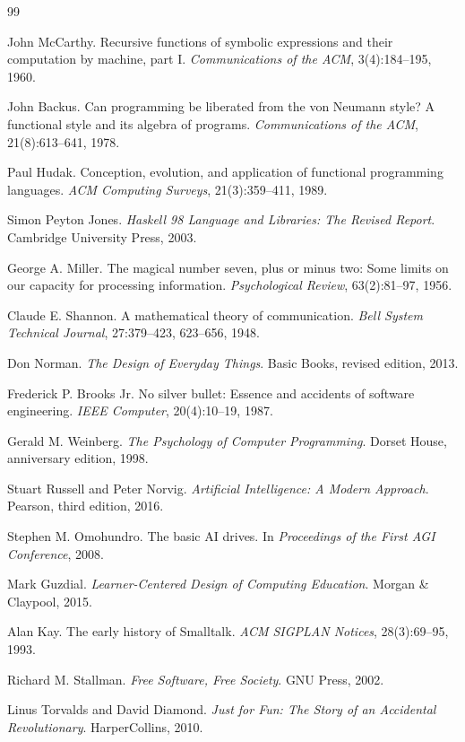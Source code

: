 \documentclass[11pt]{article}
\begin{document}
\newpage
\begin{thebibliography}{99}

John McCarthy.
\newblock Recursive functions of symbolic expressions and their computation by machine, part I.
\newblock \emph{Communications of the ACM}, 3(4):184--195, 1960.

John Backus.
\newblock Can programming be liberated from the von Neumann style? A functional style and its algebra of programs.
\newblock \emph{Communications of the ACM}, 21(8):613--641, 1978.

Paul Hudak.
\newblock Conception, evolution, and application of functional programming languages.
\newblock \emph{ACM Computing Surveys}, 21(3):359--411, 1989.

Simon Peyton Jones.
\newblock \emph{Haskell 98 Language and Libraries: The Revised Report}.
\newblock Cambridge University Press, 2003.

George A. Miller.
\newblock The magical number seven, plus or minus two: Some limits on our capacity for processing information.
\newblock \emph{Psychological Review}, 63(2):81--97, 1956.

Claude E. Shannon.
\newblock A mathematical theory of communication.
\newblock \emph{Bell System Technical Journal}, 27:379--423, 623--656, 1948.

Don Norman.
\newblock \emph{The Design of Everyday Things}.
\newblock Basic Books, revised edition, 2013.

Frederick P. Brooks Jr.
\newblock No silver bullet: Essence and accidents of software engineering.
\newblock \emph{IEEE Computer}, 20(4):10--19, 1987.

Gerald M. Weinberg.
\newblock \emph{The Psychology of Computer Programming}.
\newblock Dorset House, anniversary edition, 1998.

Stuart Russell and Peter Norvig.
\newblock \emph{Artificial Intelligence: A Modern Approach}.
\newblock Pearson, third edition, 2016.

Stephen M. Omohundro.
\newblock The basic AI drives.
\newblock In \emph{Proceedings of the First AGI Conference}, 2008.

Mark Guzdial.
\newblock \emph{Learner-Centered Design of Computing Education}.
\newblock Morgan \& Claypool, 2015.

Alan Kay.
\newblock The early history of Smalltalk.
\newblock \emph{ACM SIGPLAN Notices}, 28(3):69--95, 1993.

Richard M. Stallman.
\newblock \emph{Free Software, Free Society}.
\newblock GNU Press, 2002.

Linus Torvalds and David Diamond.
\newblock \emph{Just for Fun: The Story of an Accidental Revolutionary}.
\newblock HarperCollins, 2010.

\end{thebibliography}
\end{document}
